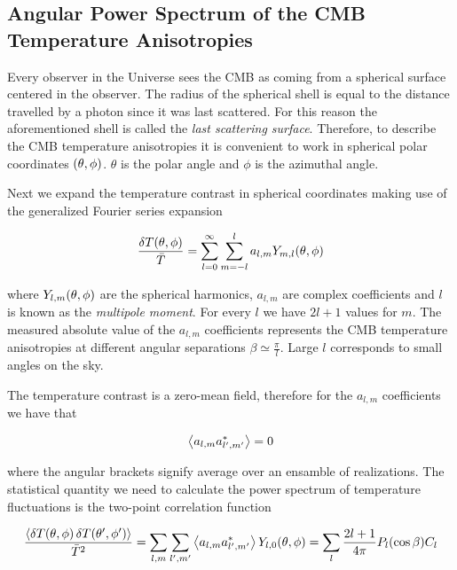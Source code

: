 \subsection{Angular Power Spectrum of the CMB Temperature Anisotropies}

Every observer in the Universe sees the CMB as coming from a spherical
surface centered in the observer. The radius of the spherical shell is
equal to the distance travelled by a photon since it was last scattered.
For this reason the aforementioned shell is called the \emph{last
scattering surface}. Therefore, to describe the CMB temperature
anisotropies it is convenient to work in spherical polar
coordinates $\qty(\theta,\phi)$. $\theta$ is the polar angle and $\phi$ is the
azimuthal angle.

Next we expand the temperature contrast in spherical coordinates making use
of the generalized Fourier series expansion

\begin{equation}
        \frac{\var{T\qty(\theta,\phi)}}{\bar T} =
        \sum^\infty_{l=0}\sum^l_{m=-l} a_{l,m}
        Y_{m,l}\qty(\theta,\phi)
\end{equation}

where $Y_{l,m}\qty(\theta,\phi)$ are the spherical harmonics, $a_{l,m}$ are
complex coefficients and $l$ is known as the \emph{multipole moment}.
For every $l$ we have $2l + 1$ values for $m$.
The measured absolute value of the $a_{l,m}$ coefficients represents the
CMB temperature anisotropies at different angular separations $\beta \simeq
\frac{\pi}{l}$. Large $l$ corresponds to small angles on the sky.

The temperature contrast is a zero-mean field, therefore for the $a_{l,m}$
coefficients we have that

\begin{equation}
        \expval{a_{l,m} a^*_{l',m'}} = 0
\end{equation}

where the angular brackets signify average over an ensamble of
realizations. The statistical quantity we need to calculate the power
spectrum of temperature fluctuations is the two-point correlation function

\begin{equation}
        \frac{\expval{\var{T\qty(\theta,\phi)} \var{T\qty(\theta',\phi')}}}
        {\bar T^2} =
        \sum_{l,m}\sum_{l',m'} \expval{a_{l,m} a^*_{l',m'}}
        Y_{l,0}\qty(\theta,\phi) =
        \sum_l \frac{2l + 1}{4\pi} P_l\qty(\cos \beta) C_l
\end{equation}

